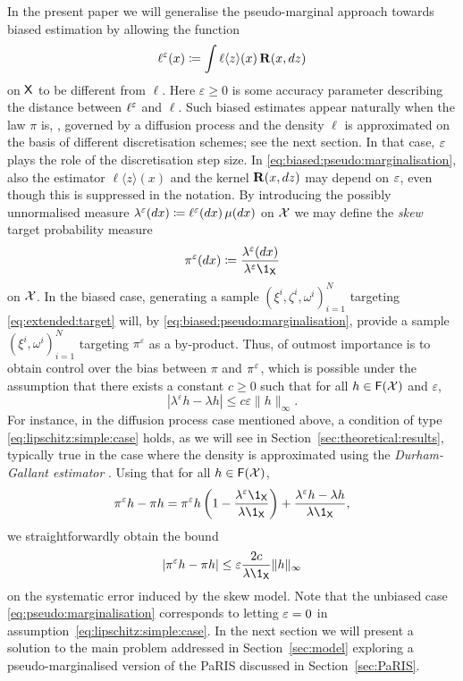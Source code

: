 In the present paper we will generalise the pseudo-marginal approach towards biased estimation by allowing the function 
\begin{equation} \label{eq:biased:pseudo:marginalisation}
    \ell^\precpar(x) \eqdef \int \ell \langle z \rangle(x) \, \mathbf{R}(x, \rmd z)
\end{equation}
on $\mathsf{X}$ to be different from $\ell$. Here $\varepsilon \geq 0$ is some accuracy parameter describing the distance between $\ell^\varepsilon$ and $\ell$. Such biased estimates appear naturally when the law $\pi$ is, \eg, governed by a diffusion process and the density $\ell$ is approximated on the basis of different discretisation schemes; see the next section. In that case, $\varepsilon$ plays the role of the discretisation step size. In \eqref{eq:biased:pseudo:marginalisation}, also the estimator $\ell \langle z \rangle(x)$ and the kernel $\mathbf{R}(x, d z)$ may depend on $\varepsilon$, even though this is suppressed in the notation. By introducing the possibly unnormalised measure $\lambda^\varepsilon(d x) \coloneqq \ell^\varepsilon(d x) \, \mu(d x)$ on $\mathcal{X}$ we may define the \emph{skew} target probability measure
$$
    \pi^\varepsilon(\rmd x) \eqdef \frac{\lambda^\precpar(\rmd x)}{\lambda^\precpar \1_\Xset}
$$
on $\mathcal{X}$. In the biased case, generating a sample $(\xi^i, \zeta^i, \omega^i)_{i = 1}^N$ targeting \eqref{eq:extended:target} will, by \eqref{eq:biased:pseudo:marginalisation}, provide a sample $(\xi^i, \omega^i)_{i = 1}^N$ targeting $\pi^\varepsilon$ as a by-product. Thus, of outmost importance is to obtain control over the bias between $\pi$ and $\pi^\varepsilon$, which is possible under the assumption that there exists a constant $c \geq 0$ such that for all $h \in \mathsf{F}(\mathcal{X})$ and $\varepsilon$,   
\begin{equation} \label{eq:lipschitz:simple:case}
    \left| \lambda^\varepsilon h - \lambda h \right| \leq c \varepsilon \| h \|_\infty. 
\end{equation}
For instance, in the diffusion process case mentioned above, a condition of type \eqref{eq:lipschitz:simple:case} holds, as we will see in Section~\ref{sec:theoretical:results}, typically true in the case where the density is approximated using the \emph{Durham-Gallant estimator} \cite{durham:gallant:2002}. Using that for all $h \in \mathsf{F}(\mathcal{X})$,  
$$
    \pi^\precpar h - \pi h = \pi^\precpar h \left( 1 - \frac{\lambda^\varepsilon \1_\Xset}{\lambda \1_\Xset} \right) + \frac{\lambda^\precpar h - \lambda h}{\lambda \1_\Xset}, 
$$
we straightforwardly obtain the bound  
$$
    \left| \pi^\precpar h - \pi h \right| \leq \precpar \frac{2 c}{\lambda \1_\Xset} \| h \|_\infty
$$
on the systematic error induced by the skew model. Note that the unbiased case \eqref{eq:pseudo:marginalisation} corresponds to letting $\varepsilon = 0$ in assumption~\eqref{eq:lipschitz:simple:case}. In the next section we will present a solution to the main problem addressed in Section~\ref{sec:model} exploring a pseudo-marginalised version of the PaRIS discussed in Section~\ref{sec:PaRIS}. 

